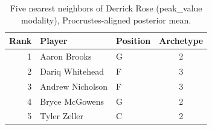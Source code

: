 \begin{table}[htbp]
  \centering\small
  \begin{tabular}{rllc}
    \toprule
    Rank & Player & Position & Archetype \\
    \midrule
    1 & Aaron Brooks & G & 2 \\
    2 & Dariq Whitehead & F & 3 \\
    3 & Andrew Nicholson & F & 3 \\
    4 & Bryce McGowens & G & 2 \\
    5 & Tyler Zeller & C & 2 \\
    \bottomrule
  \end{tabular}
  \caption{Five nearest neighbors of Derrick Rose (peak_value modality), Procrustes-aligned posterior mean.}
  \label{tab:Derrick_Rose_neighbors_peak_value}
\end{table}

